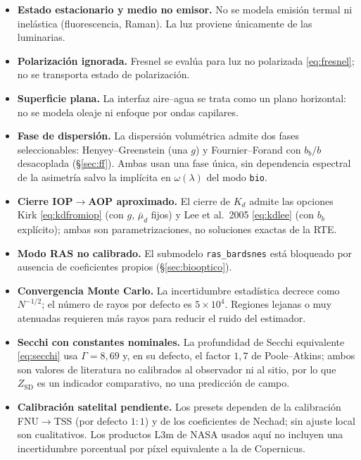 \documentclass[11pt,a4paper]{article}
\newcommand{\code}[1]{\texttt{#1}}
\begin{document}
\begin{itemize}[itemsep=3pt]
  \item \textbf{Estado estacionario y medio no emisor.} No se modela emisión
  termal ni inelástica (fluorescencia, Raman). La luz proviene únicamente de las
  luminarias.
  \item \textbf{Polarización ignorada.} Fresnel se evalúa para luz no polarizada
  \eqref{eq:fresnel}; no se transporta estado de polarización.
  \item \textbf{Superficie plana.} La interfaz aire--agua se trata como un plano
  horizontal: no se modela oleaje ni enfoque por ondas capilares.
  \item \textbf{Fase de dispersión.} La dispersión volumétrica admite dos fases
  seleccionables: Henyey--Greenstein (una $g$) y Fournier--Forand con $b_b/b$
  desacoplada (\S\ref{sec:ff}). Ambas usan una fase única, sin dependencia espectral
  de la asimetría salvo la implícita en $\omega(\lambda)$ del modo \code{bio}.
  \item \textbf{Cierre IOP$\to$AOP aproximado.} El cierre de $K_d$ admite las
  opciones Kirk \eqref{eq:kdfromiop} (con $g$, $\bar\mu_d$ fijos) y Lee et al.\ 2005
  \eqref{eq:kdlee} (con $b_b$ explícito); ambas son parametrizaciones, no soluciones
  exactas de la RTE.
  \item \textbf{Modo RAS no calibrado.} El submodelo \code{ras\_bardsnes} está
  bloqueado por ausencia de coeficientes propios (\S\ref{sec:biooptico}).
  \item \textbf{Convergencia Monte Carlo.} La incertidumbre estadística decrece como
  $N^{-1/2}$; el número de rayos por defecto es $5\times10^4$. Regiones lejanas o
  muy atenuadas requieren más rayos para reducir el ruido del estimador.
  \item \textbf{Secchi con constantes nominales.} La profundidad de Secchi
  equivalente \eqref{eq:secchi} usa $\Gamma=8{,}69$ y, en su defecto, el factor
  $1{,}7$ de Poole--Atkins; ambos son valores de literatura no calibrados al
  observador ni al sitio, por lo que $Z_\text{SD}$ es un indicador comparativo, no
  una predicción de campo.
  \item \textbf{Calibración satelital pendiente.} Los presets dependen de la
  calibración FNU$\to$TSS (por defecto $1{:}1$) y de los coeficientes de Nechad; sin
  ajuste local son cualitativos. Los productos L3m de NASA usados aquí no incluyen
  una incertidumbre porcentual por píxel equivalente a la de Copernicus.
\end{itemize}
\end{document}
